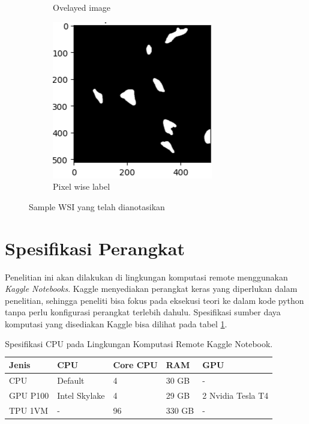 \begin{figure}[H]
\begin{subfigure}[b]{0.3\textwidth}
		\caption{Ovelayed image}
		\label{fig:overlayed-image}
	\end{subfigure}
	\hfill
	\begin{subfigure}[b]{0.3\textwidth}
		\centering
		\includegraphics[width=\textwidth]{gambar/pixelwise_label.png}
		\caption{Pixel wise label}
		\label{fig:Pixel wise label}
	\end{subfigure}
	\caption{Sample WSI yang telah dianotasikan}
	\label{fig:sample_data}
\end{figure}

\section{Spesifikasi Perangkat}

\noindent Penelitian ini akan dilakukan di lingkungan komputasi remote menggunakan \textit{Kaggle Notebooks}. Kaggle menyediakan perangkat keras yang diperlukan dalam penelitian, sehingga peneliti bisa fokus pada eksekusi teori ke dalam kode python tanpa perlu konfigurasi perangkat terlebih dahulu. Spesifikasi sumber daya komputasi yang disediakan Kaggle bisa dilihat pada tabel \ref{tab:cpu_specs}.
\begin{table}[h]
	\centering
	\caption{Spesifikasi CPU pada Lingkungan Komputasi Remote Kaggle Notebook.}
	\label{tab:cpu_specs}
	\begin{tabular}{lllll}
		\hline
		\textbf{Jenis} & \textbf{CPU}  & \textbf{Core CPU} & \textbf{RAM} & \textbf{GPU}      \\ \hline
		CPU            & Default       & 4                 & 30 GB        & -                 \\
		GPU P100       & Intel Skylake & 4                 & 29 GB        & 2 Nvidia Tesla T4 \\
		TPU 1VM        & -             & 96                & 330 GB       & -                 \\ \hline
	\end{tabular}
\end{table}


